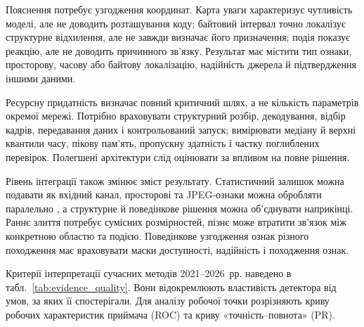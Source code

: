 Пояснення потребує узгодження координат. Карта уваги характеризує чутливість моделі, але не доводить розташування коду; байтовий інтервал точно локалізує структурне відхилення, але не завжди визначає його призначення; подія показує реакцію, але не доводить причинного зв’язку. Результат має містити тип ознаки, просторову, часову або байтову локалізацію, надійність джерела й підтвердження іншими даними.

Ресурсну придатність визначає повний критичний шлях, а не кількість параметрів окремої мережі. Потрібно враховувати структурний розбір, декодування, відбір кадрів, передавання даних і контрольований запуск; вимірювати медіану й верхні квантили часу, пікову пам’ять, пропускну здатність і частку поглиблених перевірок. Полегшені архітектури \cite{weng2022lwenet,hong2023blockpruning} слід оцінювати за впливом на повне рішення.

Рівень інтеграції також змінює зміст результату. Статистичний залишок можна подавати як вхідний канал, просторові та JPEG-ознаки можна обробляти паралельно \cite{he2025twobranch}, а структурне й поведінкове рішення можна об’єднувати наприкінці. Раннє злиття потребує сумісних розмірностей, пізнє може втратити зв’язок між конкретною областю та подією. Поведінкове узгодження ознак різного походження має враховувати маски доступності, надійність і походження ознак.

Критерії інтерпретації сучасних методів 2021--2026~рр. наведено в табл.~\ref{tab:evidence_quality}. Вони відокремлюють властивість детектора від умов, за яких її спостерігали. Для аналізу робочої точки розрізняють криву робочих характеристик приймача (ROC) та криву «точність--повнота» (PR).

